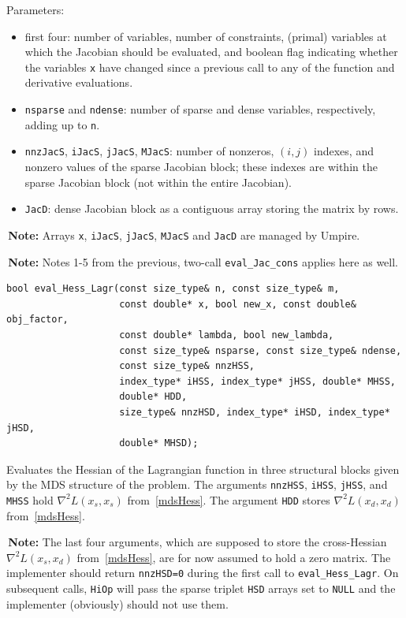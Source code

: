 \documentclass[11pt]{article}
\newcommand{\warningSymbol}{\raisebox{0.9\depth}{\danger}}
\newcommand{\warningcp}[1]{%
        \smallskip \noindent \textcolor{warningColorText}{\warningSymbol{}}\,\textbf{#1} %
    }
\newcommand{\Hi}{\texttt{HiOp}\xspace}
\begin{document}
 
   Parameters:
    \begin{itemize}
    \item  first four: number of variables, number of constraints, (primal) variables at which the
    Jacobian should be evaluated, and boolean flag indicating whether the variables \texttt{x} have
    changed since a previous call to any of the function and derivative evaluations.
    \item   \texttt{nsparse} and \texttt{ndense}: number of sparse and dense variables, respectively, adding up to \texttt{n}.
     \item   \texttt{nnzJacS}, \texttt{iJacS}, \texttt{jJacS}, \texttt{MJacS}: number of nonzeros, $(i,j)$ indexes, and nonzero values of 
   the sparse Jacobian block; these indexes are within the sparse Jacobian block (not within 
    the entire Jacobian).
     \item  \texttt{JacD}: dense Jacobian block as a contiguous array storing the matrix by rows.
    \end{itemize}

\warningcp{Note:} Arrays \texttt{x}, \texttt{iJacS}, \texttt{jJacS}, \texttt{MJacS} and \texttt{JacD} are managed by Umpire.

\warningcp{Note:} Notes 1-5 from the previous, two-call \texttt{eval\_Jac\_cons} applies here as well.
    
\begin{lstlisting} 
bool eval_Hess_Lagr(const size_type& n, const size_type& m, 
                    const double* x, bool new_x, const double& obj_factor,
                    const double* lambda, bool new_lambda,
                    const size_type& nsparse, const size_type& ndense, 
                    const size_type& nnzHSS,
                    index_type* iHSS, index_type* jHSS, double* MHSS, 
                    double* HDD,
                    size_type& nnzHSD, index_type* iHSD, index_type* jHSD,
                    double* MHSD);
\end{lstlisting} 

\noindent Evaluates the Hessian of the Lagrangian function in three structural blocks given by the MDS structure of the problem. The arguments \texttt{nnzHSS}, \texttt{iHSS}, \texttt{jHSS}, and \texttt{MHSS} hold  $\nabla^2 L(x_s,x_s)$ from~\eqref{mdsHess}. The argument \texttt{HDD} stores $\nabla^2 L(x_d,x_d)$ from~\eqref{mdsHess}. 


\warningcp{Note:} The last four arguments, which are supposed to store the cross-Hessian $\nabla^2 L(x_s,x_d)$ from~\eqref{mdsHess}, are for now assumed to hold a zero matrix. The implementer should return \texttt{nnzHSD=0} during the first call to \texttt{eval\_Hess\_Lagr}. On subsequent calls, \Hi will pass the sparse triplet \texttt{HSD} arrays   set to \texttt{NULL} and the implementer (obviously) should not use them.
 
\end{document}
